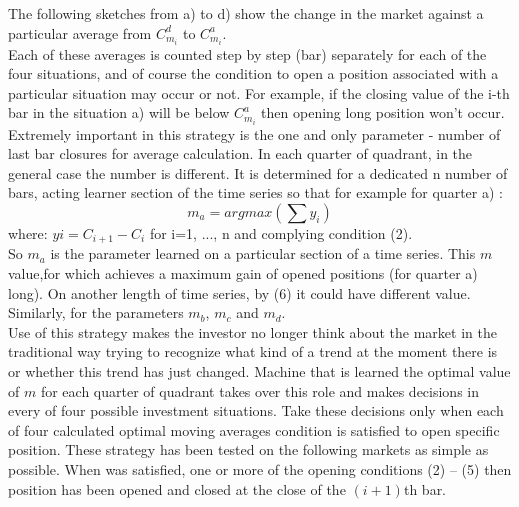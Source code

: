 \FloatBarrier
\indent The following sketches from a) to d) show the change in the market against a particular average from $C^d_{m_{i}}$ to $C^a_{m_{i}}$.\\
\indent Each of these averages is counted step by step (bar) separately for each of the four situations, and of course the condition to open a position associated with a particular situation may occur or not. For example, if the closing value of the i-th bar in the situation a) will be below $C^a_{m_{i}}$ then opening long position won't occur.\\
\indent Extremely important in this strategy is the one and only parameter - number of last bar closures for average calculation. In each quarter of quadrant, in the general case the number is different. It is determined for a dedicated n number of bars, acting learner section of the time series so that for example for quarter a) :\\
\begin{equation}
	m_a = argmax (\sum y_i  )
\end{equation}
where: $yi = C_{i+1} - C_{i}$ for i=1, ..., n and complying  condition (2).\\
\indent So $m_{a}$ is the parameter learned on a particular section of a time series. This $m$ value,for which achieves a maximum gain of opened positions (for quarter a) long). On another length of time series, by (6) it could have different value. Similarly, for the parameters $m_{b}$, $m_{c}$ and $m_{d}$.\\
\indent Use of this strategy makes the investor no longer think about the market in the traditional way trying to recognize what kind of a trend at the moment there is or whether this trend has just changed. Machine that is learned the optimal value of $m$ for each quarter of quadrant takes over this role and makes decisions in every of four possible investment situations. Take these decisions only when each of four calculated optimal moving averages condition is satisfied to open specific position.
These strategy has been tested on the following markets as simple as possible. When was satisfied, one or more of the opening conditions (2) – (5) then position has been opened and closed at the close of the $(i +1)$th bar.





